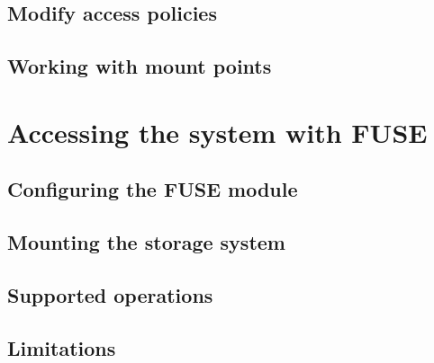 \documentclass{book}
\begin{document}

\subsection{Modify access policies} %
\label{sub:modify_access_policies}

    
\subsection{Working with mount points} %
\label{sub:working_with_mount_points}

    

\section{Accessing the system with FUSE} %
\label{sec:accessing_the_system_with_fuse}

\subsection{Configuring the FUSE module} %
\label{sub:configuring_the_fuse_module}


\subsection{Mounting the storage system} %
\label{sub:mounting_the_storage_system}


\subsection{Supported operations} %
\label{sub:supported_operations}


\subsection{Limitations} %
\label{sub:limitations}




% 
\end{document}
